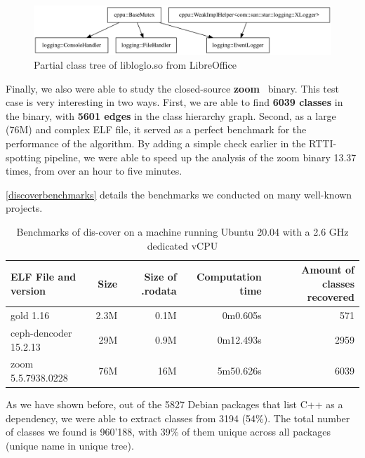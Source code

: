 \documentclass[a4paper,11pt,oneside]{report}
\begin{document}
\begin{figure}[h]

\includegraphics[width=16cm]{libloglo_partial.png}
\caption{Partial class tree of libloglo.so from LibreOffice}
\label{libloglo}

\end{figure}

Finally, we also were able to study the closed-source \textbf{zoom}~\cite{zoom} 
binary.
This test case is very interesting in two ways.
First, we are able to find \textbf{6039 classes} in the binary, with 
\textbf{5601 edges} in the class hierarchy graph.
Second, as a large (76M) and complex ELF file, it served as a perfect benchmark 
for the performance of the algorithm.
By adding a simple check earlier in the RTTI-spotting pipeline, we were able to 
speed up the analysis of the zoom binary 13.37 times, from over an hour to five 
minutes.

\autoref{discoverbenchmarks} details the benchmarks we conducted on many 
well-known projects.

\begin{table}[h]
  \centering
  {\small
  \begin{tabular}{l | r | r | r | r }
    ELF File and version & Size & Size of .rodata & Computation time & Amount 
of classes recovered  \\
    \hline
    gold 1.16 & 2.3M & 0.1M & 0m0.605s & 571 \\
    ceph-dencoder 15.2.13 & 29M & 0.9M & 0m12.493s & 2959 \\
    zoom 5.5.7938.0228 & 76M & 16M & 5m50.626s & 6039 
  \end{tabular}
  }

\caption{Benchmarks of dis-cover on a machine running Ubuntu 20.04 with a 2.6 
GHz dedicated vCPU}
\label{discoverbenchmarks}

\end{table}

As we have shown before, out of the 5827 Debian packages that list C++ as a 
dependency, we were able to extract classes from 3194 (54\%).
The total number of classes we found is 960'188, with 39\% of them unique 
across all packages (unique name in unique tree).

\end{document}
